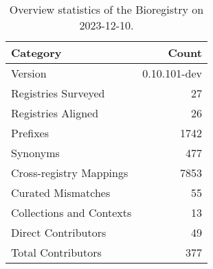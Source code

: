 \begin{table}
\caption{Overview statistics of the Bioregistry on 2023-12-10.}
\label{tab:bioregistry-summary}
\begin{tabular}{lr}
\toprule
Category & Count \\
\midrule
Version & 0.10.101-dev \\
Registries Surveyed & 27 \\
Registries Aligned & 26 \\
Prefixes & 1742 \\
Synonyms & 477 \\
Cross-registry Mappings & 7853 \\
Curated Mismatches & 55 \\
Collections and Contexts & 13 \\
Direct Contributors & 49 \\
Total Contributors & 377 \\
\bottomrule
\end{tabular}
\end{table}
